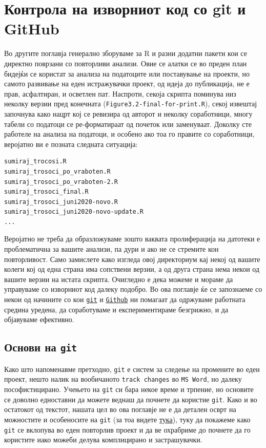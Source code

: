 \documentclass[
]{book}
\begin{document}
\hypertarget{git}{%
\chapter{Контрола на изворниот код со git и GitHub}\label{git}}

Во другите поглавја генерално зборуваме за R и разни додатни пакети кои се директно поврзани со повторливи анализи. Овие се алатки се во преден план бидејќи се користат за анализа на податоците или поставување на проекти, но самото развивање на еден истражувачки проект, од идеја до публикација, не е прав, асфалтиран, и осветлен пат. Наспроти, секоја скрипта поминува низ неколку верзии пред конечната (\texttt{Figure3.2-final-for-print.R}), секој извештај започнува како нацрт кој се ревизира од авторот и неколку соработници, многу табели со податоци се ре-форматираат од почеток или заменуваат. Доколку сте работеле на анализа на податоци, и особено ако тоа го правите со соработници, веројатно ви е позната следната ситуација:

\begin{verbatim}
sumiraj_trocosi.R
sumiraj_trosoci_po_vraboten.R
sumiraj_trosoci_po_vraboten-2.R
sumiraj_trosoci_final.R
sumiraj_trosoci_juni2020-novo.R
sumiraj_trosoci_juni2020-novo-update.R
...
\end{verbatim}

Веројатно не треба да образложуваме зошто ваквата пролиферација на датотеки е проблематична за вашите анализи, па дури и ако не се стремите кон повторливост. Само замислете како изгледа овој директориум кај некој од вашите колеги кој од една страна има сопствени верзии, а од друга страна нема некои од вашите верзии на истата скрипта. Очигледно е дека можеме и мораме да управуваме со изворниот код далеку подобро. Во ова поглавје ќе се запознаеме со некои од начините со кои \href{https://git-scm.com/}{\texttt{git}} и \href{https://github.com/}{\texttt{Github}} ни помагаат да одржуваме работната средина уредена, да соработуваме и експериментираме безгрижно, и да објавуваме ефективно.

\hypertarget{ux43eux441ux43dux43eux432ux438-ux43dux430-git}{%
\section{\texorpdfstring{Основи на \texttt{git}}{Основи на git}}\label{ux43eux441ux43dux43eux432ux438-ux43dux430-git}}

Како што напоменавме претходно, \texttt{git} е систем за следење на промените во еден проект, нешто налик на вообичаното \texttt{track\ changes} во \texttt{MS\ Word}, но далеку пософистицирано. Учењето на \texttt{git} си бара некое време и трпение, но основите се доволно едноставни да можете веднаш да почнете да користие \texttt{git}. Како и во остатокот од текстот, нашата цел во ова поглавје не е да детален осврт на можностите и особеносите на \texttt{git} (за тоа видете \href{https://git-scm.com/book/en/v2}{тука}), туку да покажеме како \texttt{git} се вклопува во еден повторлив проект и да ве охрабриме до почнете да го користите иако можеби делува комплицирано и застрашувачки.
\end{document}
